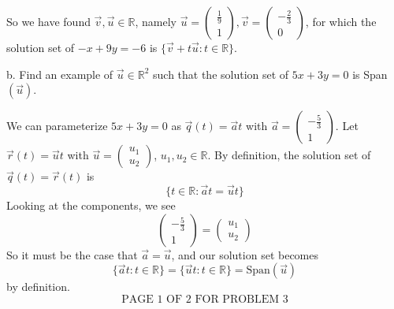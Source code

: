 \documentclass[12pt]{article}
\newenvironment{problem}[2][Problem]
{
	\begin{trivlist} 
		\item[\hskip \labelsep {\bfseries #1 #2:}]
	}
{
	\end{trivlist}
	}
\newenvironment{solution}[1][Solution]
{
	\begin{trivlist} 
		\item[\hskip \labelsep {\itshape #1:}]
	}
	{
	\end{trivlist}
}
\begin{document}
\begin{problem}{3}
\begin{solution}
\[\]
So we have found $\vec{v},\vec{u} \in \mathbb{R}$, namely $\vec{u} = \begin{pmatrix} \frac{1}{9} \\ 1 \end{pmatrix}  ,\vec{v}=\begin{pmatrix}- \frac{2}{3}\\0\end{pmatrix}$, for which the solution set of $-x +9y=-6$ is $\{\vec{v} +t \vec{u} : t \in \mathbb{R} \}$.

\end{solution}
\noindent
b. Find an example of $\vec{u} \in \mathbb{R}^2$ such that the solution set of $5x+3y=0$ is Span$(\vec{u})$.
\begin{solution}
We can parameterize $5x+3y=0$ as $\vec{q}(t)=\vec{a}t$ with $\vec{a} = \begin{pmatrix} -\frac{5}{3} \\ 1 \end{pmatrix}$. Let $\vec{r}(t)=\vec{u}t$ with $\vec{u} = \begin{pmatrix} u_1 \\ u_2 \end{pmatrix}$, $u_1,u_2 \in \mathbb{R}$. By definition, the solution set of $\vec{q}(t)=\vec{r}(t)$ is
\[
\{t \in \mathbb{R} : \vec{a}t = \vec{u}t \}
\]
Looking at the components, we see
\[
\begin{pmatrix} -\frac{5}{3} \\ 1 \end{pmatrix} = \begin{pmatrix} u_1 \\ u_2 \end{pmatrix}
\]
So it must be the case that $\vec{a} = \vec{u}$, and our solution set becomes
\[
\{\vec{a}t : t\in \mathbb{R}\} = \{\vec{u}t : t\in \mathbb{R}\} = \text{Span}(\vec{u})
\]
by definition.
\newline
\newline
\newline
\newline
\newline
\newline
\[
\text{PAGE 1 OF 2 FOR PROBLEM 3}
\]
\end{solution}
\end{problem}
\end{document}
